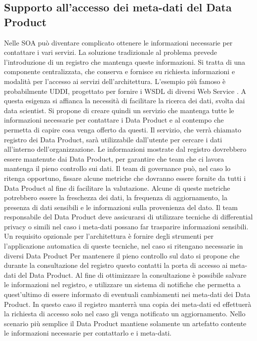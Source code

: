\documentclass[a4paper,12pt]{report}
\begin{document}
\subsection{Supporto all'accesso dei meta-dati del Data Product}
Nelle SOA può diventare complicato ottenere le informazioni necessarie per contattare i vari servizi.
La soluzione tradizionale al problema prevede l'introduzione di un registro che mantenga queste informazioni. 
Si tratta di una componente centralizzata, che conserva e fornisce su richiesta informazioni e modalità per l'accesso ai servizi dell'architettura.
L'esempio più famoso è probabilmente UDDI, progettato per fornire i WSDL di diversi Web Service \cite{curbera2002unraveling}.
A questa esigenza si affianca la necessità di facilitare  la ricerca dei dati, svolta dai data scientist.
Si propone di creare quindi un servizio che mantenga tutte le informazioni necessarie per contattare i Data Product e al contempo che permetta di capire cosa venga offerto da questi.
Il servizio, che verrà chiamato registro dei Data Product, sarà utilizzabile dall'utente per cercare i dati all'interno dell'organizzazione. 
Le informazioni mostrate dal registro dovrebbero essere mantenute dai Data Product, per garantire che team che ci lavora mantenga il pieno controllo sui dati.
Il team di governance può, nel caso lo ritenga opportuno, fissare alcune metriche che dovranno essere fornite da tutti i Data Product al fine di facilitare la valutazione.
Alcune di queste metriche potrebbero essere la freschezza dei dati, la frequenza di aggiornamento, la presenza di dati sensibili e le informazioni sulla provenienza del dato.
Il team responsabile del Data Product deve assicurarsi di utilizzare tecniche di differential privacy o simili nel caso i meta-dati possano far trasparire informazioni sensibili.
Un requisito opzionale per l'architettura è fornire degli strumenti per l'applicazione automatica di queste tecniche, nel caso si ritengano necessarie in diversi Data Product
Per mantenere il pieno controllo sul dato si propone che durante la consultazione del registro questo contatti la porta di accesso ai meta-dati del Data Product.
Al fine di ottimizzare la consultazione è possibile salvare le informazioni nel registro, e utilizzare un sistema di notifiche che permetta a quest'ultimo di essere informato di eventuali cambiamenti nei meta-dati dei Data Product.
In questo caso il registro manterrà una copia dei meta-dati ed effettuerà la richiesta di accesso solo nel caso gli venga notificato un aggiornamento.
Nello scenario più semplice il Data Product mantiene solamente un artefatto contente le informazioni necessarie per contattarlo e i meta-dati.
\end{document}
